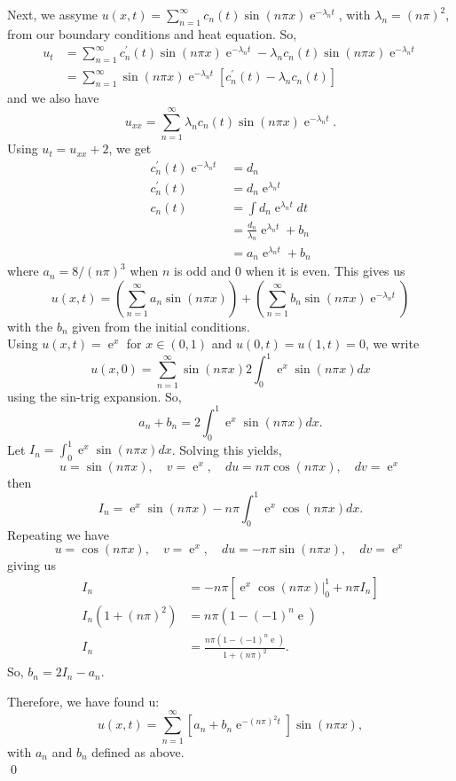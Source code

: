 \documentclass[10pt]{amsart}
\DeclareMathOperator{\E}{e}
\theoremstyle{nonumberplain}
\begin{document}
\begin{enumerate}[label={\bf {\arabic*}:}]
\begin{enumerate}
Next, we assyme $u(x, t) = \sum_{n = 1}^\infty c_n(t) \sin(n\pi x) \E^{- \lambda_n t}$, with $\lambda_n = (n\pi)^2$, from our boundary conditions and heat equation.
So,
\begin{align*}
u_t &= \sum_{n=1}^\infty c_n^\prime(t) \sin(n\pi x) \E^{-\lambda_n t} - \lambda_n c_n(t) \sin(n \pi x)\E^{-\lambda_n t} \\
	&= \sum_{n=1}^\infty \sin(n\pi x) \E^{-\lambda_n t} \left[ c_n^\prime(t) - \lambda_n c_n(t) \right]
\end{align*}
and we also have
$$
u_{xx} = \sum_{n = 1}^\infty \lambda_n c_n(t) \sin(n \pi x) \E^{-\lambda_n t}.
$$
Using $u_t = u_{xx} + 2$, we get
\begin{align*}
c_n^\prime(t)\E^{-\lambda_n t} &= d_n \\
c_n^\prime(t) &= d_n\E^{\lambda_n t} \\
c_n(t) &= \int d_n\E^{\lambda_n t} dt \\
	&=  \frac {d_n} {\lambda_n} \E^{\lambda_n t} + b_n \\
	&=  a_n \E^{\lambda_n t} + b_n
\end{align*}
where $a_n = 8/(n \pi)^3$ when $n$ is odd and 0 when it is even.
This gives us
$$
u(x, t) = \left( \sum_{n = 1}^\infty a_n \sin(n \pi x) \right) + \left( \sum_{n = 1}^\infty b_n \sin(n \pi x) \E^{- \lambda_n t} \right)
$$
with the $b_n$ given from the initial conditions. \\

\noindent
Using $u(x, t) = \E^x$ for $x \in (0, 1)$ and $u(0, t) = u(1, t) = 0$, we write
$$
u(x, 0) = \sum_{n = 1}^\infty \sin(n \pi x) 2 \int_0^1 \E^x \sin(n \pi x) dx
$$
using the sin-trig expansion.
So, 
$$
a_n + b_n = 2 \int_0^1 \E^x \sin(n \pi x) dx.
$$
Let $I_n = \int_0^1\E^x \sin(n \pi x) dx$.
Solving this yields, 
$$
u = \sin(n \pi x), \quad v = \E^x, \quad du = n \pi \cos (n \pi x), \quad dv = \E^x
$$
then
$$
I_n = \E^x\sin(n \pi x) - n \pi \int_0^1\E^x \cos(n \pi x) dx.
$$
Repeating we have
$$
u = \cos(n \pi x), \quad v = \E^x, \quad du = - n \pi \sin (n \pi x), \quad dv = \E^x
$$
giving us
\begin{align*}
I_n &= -n \pi \left[ \E^x \cos(n \pi x)|_0^1 + n \pi I_n \right] \\
I_n (1 + (n \pi)^2) &= n \pi (1 - (-1)^n\E) \\
I_n &= \frac{n \pi (1 - (-1)^n\E)}{1 + (n \pi)^2}.
\end{align*}
So, $b_n = 2I_n - a_n$.

Therefore, we have found u:
$$
u(x, t) = \sum_{n = 1}^\infty \left[a_n + b_n \E^{-(n \pi)^2 t} \right] \sin (n \pi x), 
$$
with $a_n$ and $b_n$ defined as above. \\
\qed


\end{enumerate}
\end{enumerate}
\end{document}
